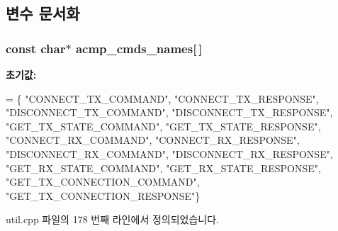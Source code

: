 \subsection{변수 문서화}
\subsubsection[{\texorpdfstring{acmp\+\_\+cmds\+\_\+names}{acmp_cmds_names}}]{\setlength{\rightskip}{0pt plus 5cm}const char$\ast$ acmp\+\_\+cmds\+\_\+names\mbox{[}$\,$\mbox{]}}\hypertarget{namespaceavdecc__lib_1_1utility_a7b55d80ea9effb96c18b17ee15778444}{}\label{namespaceavdecc__lib_1_1utility_a7b55d80ea9effb96c18b17ee15778444}
{\bfseries 초기값\+:}
\begin{DoxyCode}
=
        \{
            \textcolor{stringliteral}{"CONNECT\_TX\_COMMAND"},
            \textcolor{stringliteral}{"CONNECT\_TX\_RESPONSE"},
            \textcolor{stringliteral}{"DISCONNECT\_TX\_COMMAND"},
            \textcolor{stringliteral}{"DISCONNECT\_TX\_RESPONSE"},
            \textcolor{stringliteral}{"GET\_TX\_STATE\_COMMAND"},
            \textcolor{stringliteral}{"GET\_TX\_STATE\_RESPONSE"},
            \textcolor{stringliteral}{"CONNECT\_RX\_COMMAND"},
            \textcolor{stringliteral}{"CONNECT\_RX\_RESPONSE"},
            \textcolor{stringliteral}{"DISCONNECT\_RX\_COMMAND"},
            \textcolor{stringliteral}{"DISCONNECT\_RX\_RESPONSE"},
            \textcolor{stringliteral}{"GET\_RX\_STATE\_COMMAND"},
            \textcolor{stringliteral}{"GET\_RX\_STATE\_RESPONSE"},
            \textcolor{stringliteral}{"GET\_TX\_CONNECTION\_COMMAND"},
            \textcolor{stringliteral}{"GET\_TX\_CONNECTION\_RESPONSE"}\}
\end{DoxyCode}


util.\+cpp 파일의 178 번째 라인에서 정의되었습니다.

